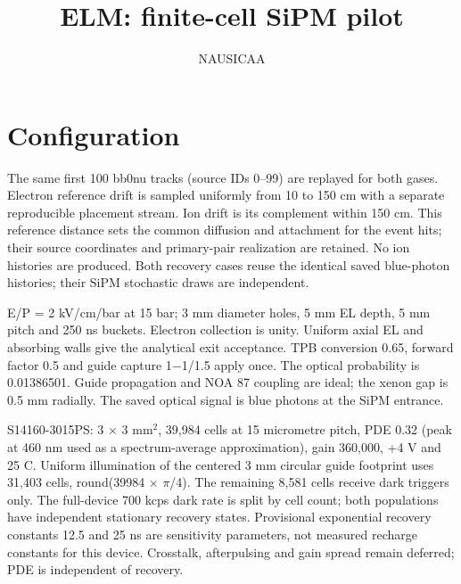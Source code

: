 \documentclass[11pt,a4paper]{article}
\begin{document}
\title{ELM: finite-cell SiPM pilot}\author{NAUSICAA}\date{}\maketitle
\section*{Configuration}
The same first 100 bb0nu tracks (source IDs 0--99) are replayed for both gases. Electron reference drift is sampled uniformly from 10 to 150 cm with a separate reproducible placement stream. Ion drift is its complement within 150 cm. This reference distance sets the common diffusion and attachment for the event hits; their source coordinates and primary-pair realization are retained. No ion histories are produced. Both recovery cases reuse the identical saved blue-photon histories; their SiPM stochastic draws are independent.

E/P = 2 kV/cm/bar at 15 bar; 3 mm diameter holes, 5 mm EL depth, 5 mm pitch and 250 ns buckets. Electron collection is unity. Uniform axial EL and absorbing walls give the analytical exit acceptance. TPB conversion 0.65, forward factor 0.5 and guide capture 1$-$1/1.5 apply once. The optical probability is 0.01386501. Guide propagation and NOA 87 coupling are ideal; the xenon gap is 0.5 mm radially. The saved optical signal is blue photons at the SiPM entrance.

S14160-3015PS: 3 $\times$ 3 mm$^2$, 39,984 cells at 15 micrometre pitch, PDE 0.32 (peak at 460 nm used as a spectrum-average approximation), gain 360,000, +4 V and 25 C. Uniform illumination of the centered 3 mm circular guide footprint uses 31,403 cells, round(39984 $\times$ $\pi$/4). The remaining 8,581 cells receive dark triggers only. The full-device 700 kcps dark rate is split by cell count; both populations have independent stationary recovery states. Provisional exponential recovery constants 12.5 and 25 ns are sensitivity parameters, not measured recharge constants for this device. Crosstalk, afterpulsing and gain spread remain deferred; PDE is independent of recovery.
\end{document}
